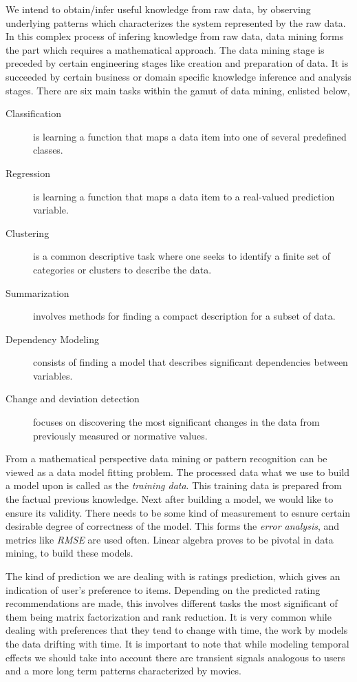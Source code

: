 We intend to obtain/infer useful knowledge from raw data, by observing
underlying patterns which characterizes the system represented by the raw data.
In this complex process of infering knowledge from raw data, data mining forms
the part which requires a mathematical approach. The data mining stage is
preceded by certain engineering stages like creation and preparation of data. It
is succeeded by certain business or domain specific knowledge inference and
analysis stages. There are six main tasks within the gamut of data mining,
enlisted below, \cite{Fayyad96fromdata}
\begin{description}
  \item[Classification] is learning a function that maps a data item into one of
several predefined classes.
  \item[Regression] is learning a function that maps a data item to a
real-valued prediction variable.
  \item[Clustering] is a common descriptive task where one seeks to identify a
finite set of categories or clusters to describe the data.
  \item[Summarization] involves methods for finding a compact description for a
subset of data.
  \item[Dependency Modeling] consists of finding a model that describes
significant dependencies between variables.
\item[Change and deviation detection] focuses on discovering the most
significant changes in
the data from previously measured or normative values.
\end{description}

From a mathematical perspective data mining or pattern recognition can be viewed
as a data model fitting problem. The processed data what we use to build a
model upon is called as the \emph{training data}. This training data is prepared from
the factual previous knowledge. Next after building a model, we would like to
ensure its validity. There needs to be some kind of measurement to esnure
certain desirable degree of correctness of the model. This forms the \emph{error
analysis}, and metrics like \emph{RMSE} are used often. Linear algebra proves to be
pivotal in data mining, \cite{eld-mm:07} to build these models. 

The kind of prediction we are dealing with is ratings prediction, which gives
an indication of user's preference to items. Depending on the predicted rating
recommendations are made, this involves different tasks the most significant of
them being matrix factorization and rank reduction. It is very common while
dealing with preferences that they tend to change with time, the work by
\cite{Koren:2010:CFT:1721654.1721677} models the data drifting with time. It is
important to note that while modeling temporal effects we should take into
account there are transient signals analogous to users and a more long term
patterns characterized by movies.


